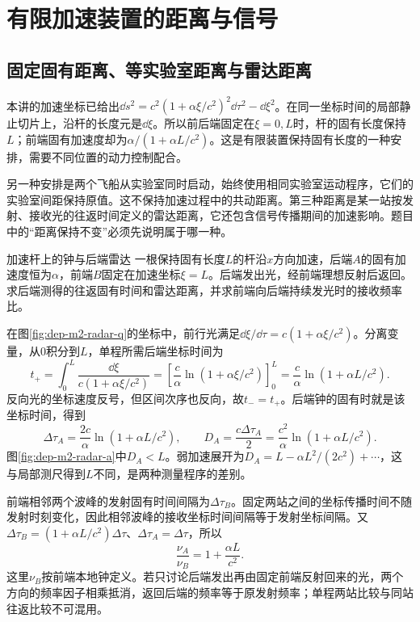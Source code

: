 \section{有限加速装置的距离与信号}
\subsection{固定固有距离、等实验室距离与雷达距离}
本讲的加速坐标已给出$\dd s^2=c^2(1+\alpha\xi/c^2)^2\dd\tau^2-\dd\xi^2$。在同一坐标时间的局部静止切片上，沿杆的长度元是$\dd\xi$。所以前后端固定在$\xi=0,L$时，杆的固有长度保持$L$；前端固有加速度却为$\alpha/(1+\alpha L/c^2)$。这是有限装置保持固有长度的一种安排，需要不同位置的动力控制配合。

另一种安排是两个飞船从实验室同时启动，始终使用相同实验室运动程序，它们的实验室间距保持原值。这不保持加速过程中的共动距离。第三种距离是某一站按发射、接收光的往返时间定义的雷达距离，它还包含信号传播期间的加速影响。题目中的“距离保持不变”必须先说明属于哪一种。

\begin{example}加速杆上的钟与后端雷达
一根保持固有长度$L$的杆沿$x$方向加速，后端$A$的固有加速度恒为$\alpha$，前端$B$固定在加速坐标$\xi=L$。后端发出光，经前端理想反射后返回。求后端测得的往返固有时间和雷达距离，并求前端向后端持续发光时的接收频率比。
\end{example}
\begin{solution}
在图\ref{fig:dep-m2-radar-q}的坐标中，前行光满足$\dd\xi/\dd\tau=c(1+\alpha\xi/c^2)$。分离变量，从0积分到$L$，单程所需后端坐标时间为
\[
 t_+=\int_0^L\frac{\dd\xi}{c(1+\alpha\xi/c^2)}
 =\left[\frac c\alpha\ln(1+\alpha\xi/c^2)\right]_0^L
 =\frac c\alpha\ln(1+\alpha L/c^2).
\]
反向光的坐标速度反号，但区间次序也反向，故$t_-=t_+$。后端钟的固有时就是该坐标时间，得到
\[
 \Delta\tau_A=\frac{2c}{\alpha}\ln(1+\alpha L/c^2),\qquad
 D_A=\frac{c\Delta\tau_A}{2}
 =\frac{c^2}{\alpha}\ln(1+\alpha L/c^2).
\]
图\ref{fig:dep-m2-radar-a}中$D_A<L$。弱加速展开为$D_A=L-\alpha L^2/(2c^2)+\cdots$，这与局部测尺得到$L$不同，是两种测量程序的差别。

前端相邻两个波峰的发射固有时间间隔为$\Delta\tau_B$。固定两站之间的坐标传播时间不随发射时刻变化，因此相邻波峰的接收坐标时间间隔等于发射坐标间隔。又$\Delta\tau_B=(1+\alpha L/c^2)\Delta\tau$、$\Delta\tau_A=\Delta\tau$，所以
\[
 \frac{\nu_A}{\nu_B}=1+\frac{\alpha L}{c^2}.
\]
这里$\nu_B$按前端本地钟定义。若只讨论后端发出再由固定前端反射回来的光，两个方向的频率因子相乘抵消，返回后端的频率等于原发射频率；单程两站比较与同站往返比较不可混用。
\end{solution}

